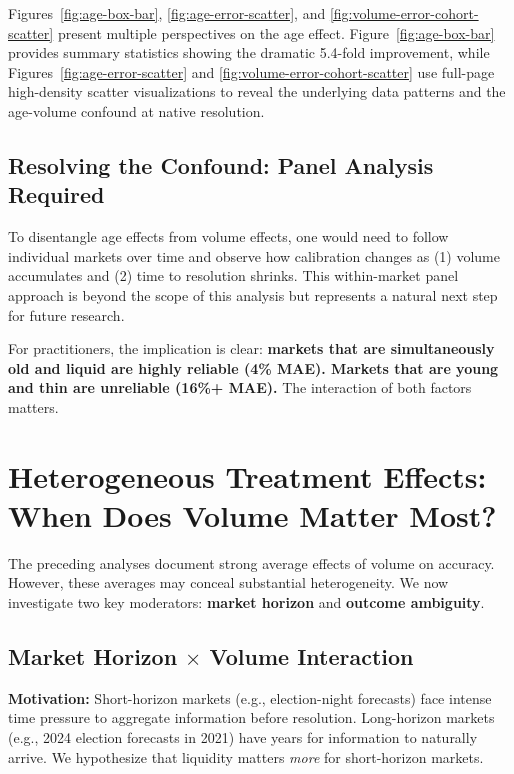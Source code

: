 \documentclass[12pt,letterpaper]{article}
\begin{document}
Figures~\ref{fig:age-box-bar}, \ref{fig:age-error-scatter}, and \ref{fig:volume-error-cohort-scatter} present multiple perspectives on the age effect. Figure~\ref{fig:age-box-bar} provides summary statistics showing the dramatic 5.4-fold improvement, while Figures~\ref{fig:age-error-scatter} and \ref{fig:volume-error-cohort-scatter} use full-page high-density scatter visualizations to reveal the underlying data patterns and the age-volume confound at native resolution.

\subsection{Resolving the Confound: Panel Analysis Required}

To disentangle age effects from volume effects, one would need to follow individual markets over time and observe how calibration changes as (1) volume accumulates and (2) time to resolution shrinks. This within-market panel approach is beyond the scope of this analysis but represents a natural next step for future research.

For practitioners, the implication is clear: \textbf{markets that are simultaneously old and liquid are highly reliable (4\% MAE). Markets that are young and thin are unreliable (16\%+ MAE).} The interaction of both factors matters.

\clearpage
\section{Heterogeneous Treatment Effects: When Does Volume Matter Most?}\label{sec:heterogeneous}

The preceding analyses document strong average effects of volume on accuracy. However, 
these averages may conceal substantial heterogeneity. We now investigate two key 
moderators: \textbf{market horizon} and \textbf{outcome ambiguity}.

\subsection{Market Horizon $\times$ Volume Interaction}\label{subsec:horizon-interaction}

\textbf{Motivation:} Short-horizon markets (e.g., election-night forecasts) face 
intense time pressure to aggregate information before resolution. Long-horizon markets 
(e.g., 2024 election forecasts in 2021) have years for information to naturally arrive. 
We hypothesize that liquidity matters \textit{more} for short-horizon markets.
\end{document}
